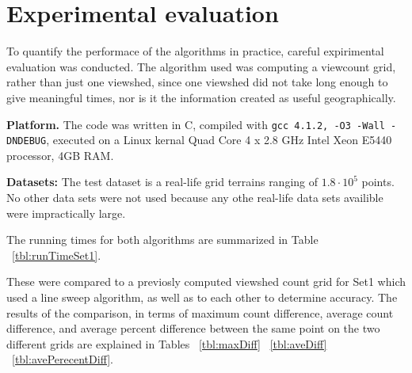 \message{ !name(Horizon Algorithms.tex)}\documentclass[11pt,twocolumn]{article}
\begin{document}
\section{Experimental evaluation}

To quantify the performace of the algorithms in practice, careful expirimental evaluation was conducted.  The algorithm used was computing a viewcount grid, rather than just one viewshed, since one viewshed did not take long enough to give meaningful times, nor is it the information created as useful geographically.

{\bf Platform.} The code was written in C, compiled with \texttt{gcc
  4.1.2, -O3 -Wall -DNDEBUG}, executed on a Linux kernal Quad Core 4 x 2.8 GHz Intel Xeon E5440 processor, 4GB RAM.

{\bf Datasets: } The test dataset is a real-life grid terrains ranging of $1.8\cdot 10^5$ points.  No other data sets were not used because any othe real-life data sets availible were impractically large.

The running times for both algorithms are summarized in Table ~\ref{tbl:runTimeSet1}.

\begin{table}[htp]
  \caption{Running times (seconds) and CPU-utilization.}
  \label{tbl:runTimeSet1}
\end{table}

These were compared to a previosly computed viewshed count grid for Set1 which used a line sweep algorithm, as well as to each other to determine accuracy.  The results of the comparison, in terms of maximum count difference, average count difference, and average percent difference between the same point on the two different grids are explained in Tables ~\ref{tbl:maxDiff} ~\ref{tbl:aveDiff} ~\ref{tbl:avePerecentDiff}.

\begin{table}[htp]
      \caption{The maximum difference in count between various viewcount algorithms.}
      \label{tbl:maxDiff}
\end{table}
\end{document}
